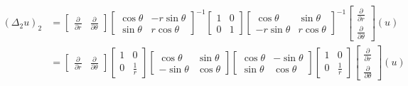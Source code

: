 \documentclass[\ROOT/main.tex]{subfiles}
\begin{document}
\begin{align*}
    \left( \Delta_2 u \right)_2
    &=
    \begin{bmatrix}
        \frac{\partial}{\partial r} & \frac{\partial}{\partial \theta}
    \end{bmatrix}
    \begin{bmatrix}
        \cos \theta & -r \sin \theta \\
        \sin \theta & r \cos \theta
    \end{bmatrix}^{-1}
    \begin{bmatrix}
        1 & 0 \\
        0 & 1
    \end{bmatrix}
    \begin{bmatrix}
        \cos \theta & \sin \theta \\
        -r \sin \theta & r \cos \theta
    \end{bmatrix}^{-1}
    \begin{bmatrix}
        \frac{\partial}{\partial r} \\
        \frac{\partial}{\partial \theta}
    \end{bmatrix}
    \left( u \right) \\
    &=
    \begin{bmatrix}
        \frac{\partial}{\partial r} & \frac{\partial}{\partial \theta}
    \end{bmatrix}
    \begin{bmatrix}
        1 & 0 \\
        0 & \frac{1}{r}
    \end{bmatrix}
    \begin{bmatrix}
        \cos \theta & \sin \theta \\
        - \sin \theta & \cos \theta
    \end{bmatrix}
    \begin{bmatrix}
        \cos \theta & - \sin \theta \\
        \sin \theta & \cos \theta
    \end{bmatrix}
    \begin{bmatrix}
        1 & 0 \\
        0 & \frac{1}{r}
    \end{bmatrix}
    \begin{bmatrix}
        \frac{\partial}{\partial r} \\
        \frac{\partial}{\partial \theta}
    \end{bmatrix}
    \left( u \right) \\

\end{align*}
\end{document}
